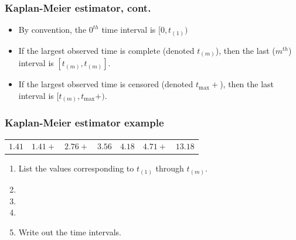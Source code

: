 \begin{frame}
\frametitle{Kaplan-Meier estimator, cont.}
\begin{itemize}
\item By convention, the $0^{th}$ time interval is $[0,t_{(1)})$
\item If the largest observed time is complete (denoted $t_{(m)}$), then the last ($m^{th}$) interval is $[t_{(m)},t_{(m)}]$.
\item If the largest observed time is censored (denoted $t_{\mbox{max}}+$), then the last interval is $[t_{(m)},t_{\mbox{max}}+)$.
\end{itemize}
\end{frame}


\begin{frame}
\frametitle{Kaplan-Meier estimator example}
\begin{center}
\begin{tabular}{ccccccc}
$1.41$ & $1.41+$ & $2.76+$ & $3.56$ & $4.18$ &  $4.71+$   & $13.18$ \\
\end{tabular}
\end{center}
\begin{enumerate}
\item  List the values corresponding to $t_{(1)}$ through $t_{(m)}$.
\item[]
\item[]
\item[]
\item Write out the time intervals.
\end{enumerate}
\vskip200pt
\end{frame}

